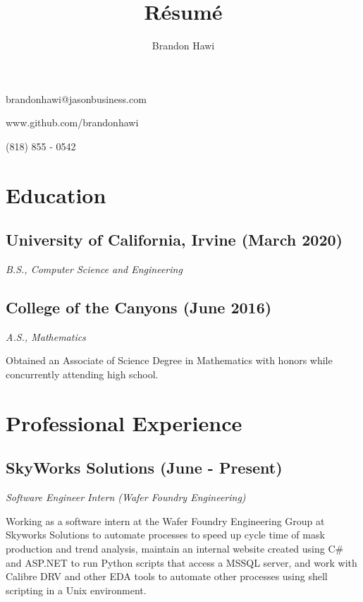 \documentclass{article}
\makeatletter
\renewcommand{\maketitle}
{
\begin{flushleft}
\huge
\textbf{\theauthor}
\small

brandonhawi@jasonbusiness.com

www.github.com/brandonhawi

(818) 855 - 0542
\end{flushleft}
}
\makeatother
\begin{document}
\title{R\'esum\'e}
\author{Brandon Hawi}

\maketitle
\vspace{-0.1in}
\section{Education}

\subsection{University of California, Irvine (March 2020)}
\noindent\textit{B.S., Computer Science and Engineering}

\subsection{College of the Canyons (June 2016)}
\noindent\textit{A.S., Mathematics}

Obtained an Associate of Science Degree in Mathematics with honors while concurrently attending
high school.

\section{Professional Experience}

%
%
%

\subsection{SkyWorks Solutions (June - Present)}

\noindent\textit{Software Engineer Intern (Wafer Foundry Engineering)}

Working as a software intern at the Wafer Foundry Engineering Group at Skyworks Solutions to 
automate processes to speed up cycle time of mask production and trend analysis, maintain an internal website 
created using C\# and ASP.NET to run Python scripts that access a MSSQL server, and work with Calibre DRV and other EDA tools to 
automate other processes using shell scripting in a Unix environment.
\end{document}
